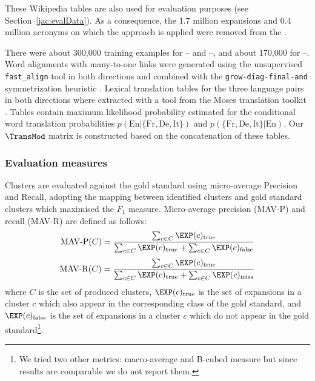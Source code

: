 \documentclass[output=paper]{langsci/langscibook}
\begin{document}
These Wikipedia tables are also used for evaluation purposes (see
Section~\ref{jac:evalData}). As a consequence, the 1.7 million expansions
and 0.4 million acronyms on which the approach is applied were removed
from the .

There were about 300,000 training examples for -- and
--, and about 170,000 for --.  Word
alignments with many-to-one links were generated using the
unsupervised \texttt{fast\_align} tool \citep{dyer-13} in both directions
and combined with the \texttt{grow-diag-final-and} symmetrization
heuristic \citep{koehn-03}. Lexical translation tables for the three
language pairs in both directions where extracted with a tool from the
Moses translation toolkit \citep{koehn2007moses}. Tables contain maximum
likelihood probability estimated for the conditional word translation
probabilities $p(\text{En}|\{\text{Fr},\text{De},\text{It}\})$ and $p(\{\text{Fr},\text{De},\text{It}\}|\text{En})$. Our
$\TransMod$ matrix is constructed based on the concatenation of these
tables.



\subsubsection{Evaluation measures}

Clusters are evaluated against the gold standard using micro-average
Precision and Recall, adopting the mapping between identified clusters
and gold standard clusters which maximised the $F_1$
measure. Micro-average precision (MAV-P) and recall (MAV-R) are
defined as follows:
\begin{equation}
\text{MAV-P} (C) = \frac{\sum_{c \in C}{\EXP(c)_{\text{true}}}}{\sum_{c \in C}{\EXP(c)_{\text{true}}}+\sum_{c \in
 C}{\EXP(c)_{\text{false}}}}
\end{equation}
\begin{equation}
\text{MAV-R} (C) = \frac{\sum_{c \in C}{\EXP(c)_{\text{true}}}}{\sum_{c \in C}{\EXP(c)_{\text{true}}}+\sum_{c \in C}{\EXP(c)_{\text{miss}}}}
\end{equation}
where $C$ is the set of produced clusters, $\EXP(c)_{\text{true}}$ is the set
of expansions in a cluster $c$ which also appear in the corresponding
class of the gold standard, and $\EXP(c)_{\text{false}}$ is the set of
expansions in a cluster $c$ which do not appear in the gold
standard\footnote{We tried two other metrics: macro-average and
  B-cubed measure \citep{bagga-98} but since results are comparable we
  do not report them.}.
\end{document}
